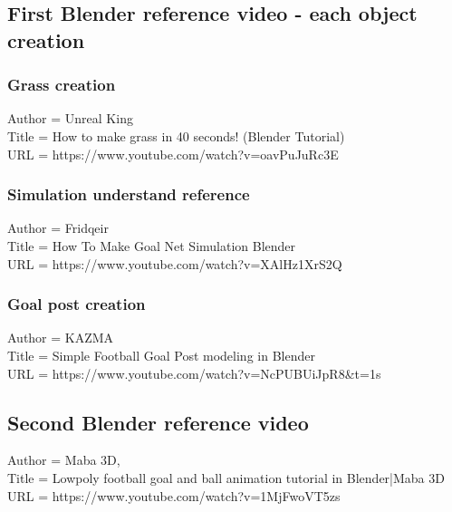 \documentclass[ fontsize=11pt,twoside]{scrartcl}	%
\begin{document}
\subsection{First Blender reference video - each object creation}

\subsubsection{Grass creation}
Author = {Unreal King}
\\
Title = {{How to make grass in 40 seconds! (Blender Tutorial)}}
\\
URL = {https://www.youtube.com/watch?v=oavPuJuRc3E}

\subsubsection{Simulation understand reference}
Author = {Fridqeir}
\\
Title = {{How To Make Goal Net Simulation Blender}}
\\
URL = {https://www.youtube.com/watch?v=XAlHz1XrS2Q}

\subsubsection{Goal post creation}

Author = {KAZMA}
\\
Title = {{Simple Football Goal Post modeling in Blender}}
\\
URL = {https://www.youtube.com/watch?v=NcPUBUiJpR8&t=1s}

\subsection{Second Blender reference video}
Author = {Maba 3D},
\\
Title = {{Lowpoly football goal and ball animation tutorial in Blender|Maba 3D}}
\\
URL = {https://www.youtube.com/watch?v=1MjFwoVT5zs}


\end{document}
